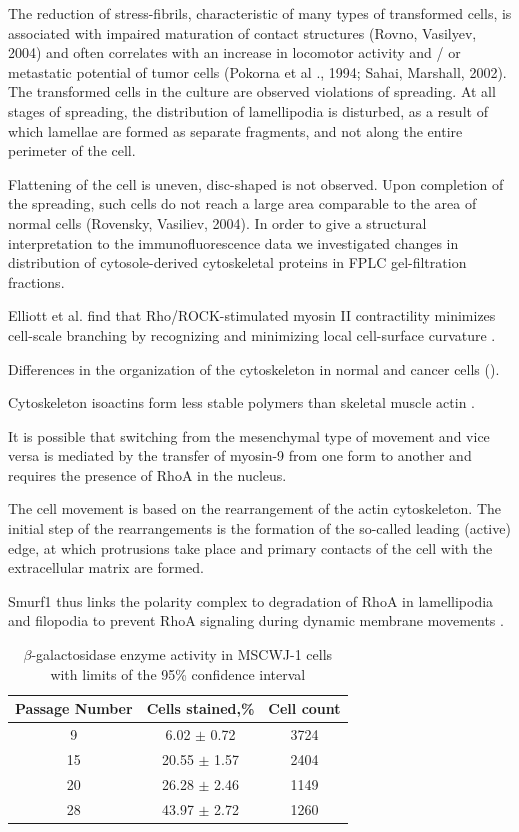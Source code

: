 \documentclass[num-refs]{wiley-article}
\begin{document}
The reduction of stress-fibrils, characteristic of many types of transformed cells, is associated with impaired maturation of contact structures (Rovno, Vasilyev, 2004) and often correlates with an increase in locomotor activity and / or metastatic potential of tumor cells (Pokorna et al ., 1994; Sahai, Marshall, 2002).
The transformed cells in the culture are observed violations of spreading.
At all stages of spreading, the distribution of lamellipodia is disturbed, as a result of which lamellae are formed as separate fragments, and not along the entire perimeter of the cell.

Flattening of the cell is uneven, disc-shaped is not observed.
Upon completion of the spreading, such cells do not reach a large area comparable to the area of normal cells (Rovensky, Vasiliev, 2004).
In order to give a structural interpretation to the immunofluorescence data we investigated changes in distribution of cytosole-derived cytoskeletal proteins in FPLC gel-filtration fractions.

Elliott et al. find that Rho/ROCK-stimulated myosin II contractility minimizes cell-scale branching by recognizing and minimizing local cell-surface curvature \cite{elliott2015myosin}.

Differences in the organization of the cytoskeleton in normal and cancer cells (\cite{shutova2010normal}).

Cytoskeleton isoactins form less stable polymers than skeletal muscle actin \cite{khaitlina2001functional}.

It is possible that switching from the mesenchymal type of movement and vice versa is mediated by the transfer of myosin-9 from one form to another and requires the presence of RhoA in the nucleus.

The cell movement is based on the rearrangement of the actin cytoskeleton. The initial step of the rearrangements is the formation of the so-called leading (active) edge, at which protrusions take place and primary contacts of the cell with the extracellular matrix are formed.

Smurf1 thus links the polarity complex to degradation of RhoA in lamellipodia and filopodia to prevent RhoA signaling during dynamic membrane movements \cite{wang2003regulation}.

\begin{table}[hbt!]
  \caption{$\beta$-galactosidase enzyme activity in MSCWJ-1 cells with limits of the 95\% confidence interval}
  \label{tab}
\centering
\begin{tabular}{c|c|c}
 Passage Number & Cells stained,\% & Cell count  \\
 \hline
 9 & 6.02 $\pm$ 0.72 & 3724 \\
 15 & 20.55 $\pm$ 1.57 & 2404 \\
 20 & 26.28 $\pm$ 2.46 & 1149  \\
 28 & 43.97 $\pm$ 2.72 & 1260
\end{tabular}
\end{table}

\fi
\end{document}
